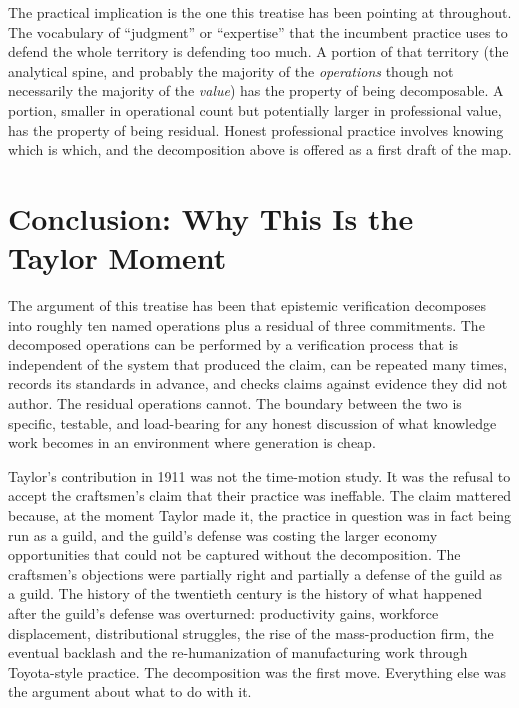 \documentclass[11pt]{article}
\begin{document}
The practical implication is the one this treatise has been pointing at throughout. The vocabulary of ``judgment'' or ``expertise'' that the incumbent practice uses to defend the whole territory is defending too much. A portion of that territory (the analytical spine, and probably the majority of the \emph{operations} though not necessarily the majority of the \emph{value}) has the property of being decomposable. A portion, smaller in operational count but potentially larger in professional value, has the property of being residual. Honest professional practice involves knowing which is which, and the decomposition above is offered as a first draft of the map.

\section*{Conclusion: Why This Is the Taylor Moment}

The argument of this treatise has been that epistemic verification decomposes into roughly ten named operations plus a residual of three commitments. The decomposed operations can be performed by a verification process that is independent of the system that produced the claim, can be repeated many times, records its standards in advance, and checks claims against evidence they did not author. The residual operations cannot. The boundary between the two is specific, testable, and load-bearing for any honest discussion of what knowledge work becomes in an environment where generation is cheap.

Taylor's contribution in 1911 was not the time-motion study. It was the refusal to accept the craftsmen's claim that their practice was ineffable. The claim mattered because, at the moment Taylor made it, the practice in question was in fact being run as a guild, and the guild's defense was costing the larger economy opportunities that could not be captured without the decomposition. The craftsmen's objections were partially right and partially a defense of the guild as a guild. The history of the twentieth century is the history of what happened after the guild's defense was overturned: productivity gains, workforce displacement, distributional struggles, the rise of the mass-production firm, the eventual backlash and the re-humanization of manufacturing work through Toyota-style practice. The decomposition was the first move. Everything else was the argument about what to do with it.
\end{document}
